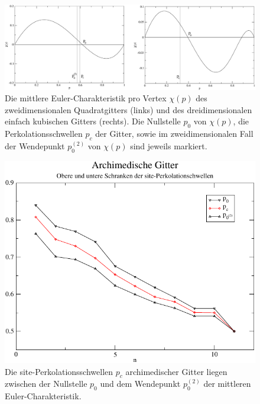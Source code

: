 \begin{figure}[htbp]
  \centering
  \includegraphics[width=5.5in]{./Einleitung-figs/chi}
  \caption{Die mittlere Euler-Charakteristik pro Vertex $\chi(p)$ des zweidimensionalen Quadratgitters (links) und des dreidimensionalen einfach kubischen Gitters (rechts). Die Nullstelle $p_0$ von $\chi(p)$, die Perkolationsschwellen $p_c$ der Gitter, sowie im zweidimensionalen Fall der Wendepunkt $p_0^{(2)}$ von $\chi(p)$ sind jeweils markiert.}
  \label{fig:chieinleit}
\end{figure}


\begin{figure}[htbp]
  \centering
  \includegraphics[width=5.5in]{./Einleitung-figs/archisitesingle}
  \caption{Die site-Perkolationsschwellen $p_c$ archimedischer Gitter liegen zwischen der Nullstelle $p_0$ und dem Wendepunkt $p_0^{(2)}$ der mittleren Euler-Charakteristik.}
  \label{fig:archisite}
\end{figure}


